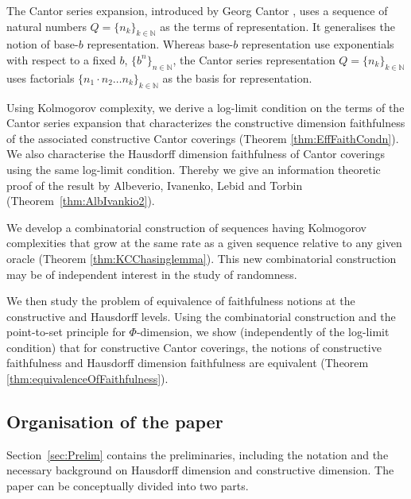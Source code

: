 \documentclass[11pt]{article}
\newcommand{\N}{\mathbb{N}}
\begin{document}
The Cantor series
expansion, introduced by Georg Cantor \cite{Cantor1932}, uses a sequence of natural numbers $Q = \{n_k\}_{k \in \N}$ as the terms of representation. It generalises the notion of base-$b$ representation. Whereas
base-$b$ representation use
exponentials with respect to a fixed $b$, 
$\{b^n\}_{n \in \N}$, the Cantor series representation $Q = \{n_k\}_{k \in \N}$ uses factorials $\{n_1 \cdot n_2 \dots n_k\}_{k \in \N}$ as
the basis for representation. 

Using Kolmogorov complexity, we derive a log-limit condition on the terms of the Cantor series expansion that characterizes the constructive dimension faithfulness of the associated constructive Cantor coverings (Theorem \ref{thm:EffFaithCondn}).  We also characterise the Hausdorff dimension faithfulness of Cantor coverings using the same
log-limit condition. Thereby we give an information theoretic proof of the result by Albeverio, Ivanenko, Lebid and Torbin  \cite{Albeverio2020} (Theorem~\ref{thm:AlbIvankio2}).




We develop a
combinatorial construction of sequences having Kolmogorov complexities
that grow at the same rate as a given sequence relative to any given
oracle (Theorem \ref{thm:KCChasinglemma}). This new combinatorial
construction may be of independent interest in the study of
randomness.

We then study the problem of equivalence of faithfulness notions at the constructive and Hausdorff levels.
Using the combinatorial construction and the point-to-set principle for $\Phi$-dimension, we show (independently of the log-limit condition) that for constructive Cantor coverings, the notions of
constructive faithfulness and Hausdorff dimension faithfulness are
equivalent (Theorem \ref{thm:equivalenceOfFaithfulness}). 




\subsection{Organisation of the paper}

Section~\ref{sec:Prelim} contains the preliminaries, including the
notation and the necessary background on Hausdorff dimension and
constructive dimension.
The paper can be conceptually divided into two parts.
\end{document}
